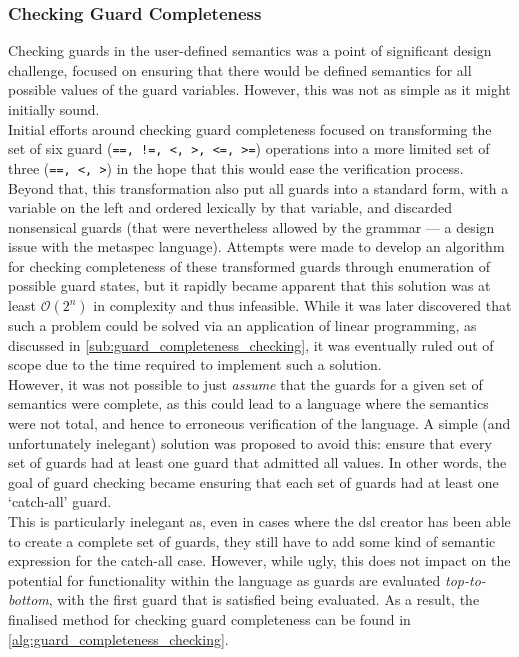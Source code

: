 \subsubsection{Checking Guard Completeness} %
\label{ssub:checking_guard_completeness}
Checking guards in the user-defined semantics was a point of significant design challenge, focused on ensuring that there would be defined semantics for all possible values of the guard variables. 
However, this was not as simple as it might initially sound.\\

Initial efforts around checking guard completeness focused on transforming the set of six guard (\texttt{==, !=, <, >, <=, >=}) operations into a more limited set of three (\texttt{==, <, >}) in the hope that this would ease the verification process.
Beyond that, this transformation also put all guards into a standard form, with a variable on the left and ordered lexically by that variable, and discarded nonsensical guards (that were nevertheless allowed by the grammar --- a design issue with the \gls{metaspec} language). 
Attempts were made to develop an algorithm for checking completeness of these transformed guards through enumeration of possible guard states, but it rapidly became apparent that this solution was at least $\mathcal{O}(2^n)$ in complexity and thus infeasible. 
While it was later discovered that such a problem could be solved via an application of linear programming, as discussed in \autoref{sub:guard_completeness_checking}, it was eventually ruled out of scope due to the time required to implement such a solution.\\

However, it was not possible to just \textit{assume} that the guards for a given set of semantics were complete, as this could lead to a language where the semantics were not total, and hence to erroneous verification of the language.
A simple (and unfortunately inelegant) solution was proposed to avoid this: ensure that every set of guards had at least one guard that admitted all values.
In other words, the goal of guard checking became ensuring that each set of guards had at least one `catch-all' guard. \\

This is particularly inelegant as, even in cases where the \gls{dsl} creator has been able to create a complete set of guards, they still have to add some kind of semantic expression for the catch-all case. 
However, while ugly, this does not impact on the potential for functionality within the language as guards are evaluated \textit{top-to-bottom}, with the first guard that is satisfied being evaluated. 
As a result, the finalised method for checking guard completeness can be found in \autoref{alg:guard_completeness_checking}.

